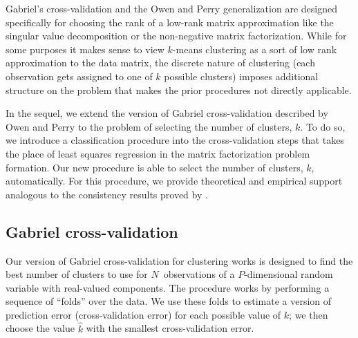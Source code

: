 \documentclass[12pt]{article}
\begin{document}

Gabriel's cross-validation and the Owen and Perry generalization are designed
specifically for choosing the rank of a low-rank matrix approximation like the
singular value decomposition or the non-negative matrix factorization. While
for some purposes it makes sense to view $k$-means clustering as a sort of low
rank approximation to the data matrix, the discrete nature of clustering (each
observation gets assigned to one of $k$ possible clusters) imposes additional
structure on the problem that makes the prior procedures not directly
applicable.

In the sequel, we extend the version of Gabriel cross-validation described by
Owen and Perry to the problem of selecting the number of clusters, $k$. To do
so, we introduce a classification procedure into the cross-validation steps
that takes the place of least squares regression in the matrix factorization
problem formation. Our new procedure is able to select the number of clusters,
$k$, automatically. For this procedure, we provide theoretical and empirical
support analogous to the consistency results proved by \citet{owen2009bi}.


\subsection{Gabriel cross-validation}
\label{sec:gabriel-cv-algorithm}


Our version of Gabriel cross-validation for clustering works is designed to
find the best number of clusters to use for $N$~observations of a
$P$-dimensional random variable with real-valued components.
The procedure works by performing a
sequence of ``folds'' over the data. We use these folds to estimate a version
of prediction error (cross-validation error) for each possible value of $k$;
we then choose the value $\hat k$ with the smallest cross-validation error.
\end{document}
